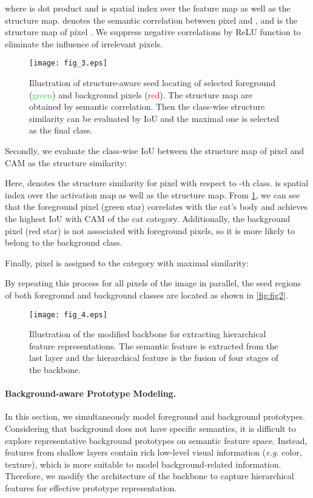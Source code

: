 \documentclass[10pt,twocolumn,letterpaper]{article}
\begin{document}
where  is dot product and  is spatial index over the feature map as well as the structure map.
 denotes the semantic correlation between pixel  and , and  is the structure map of pixel .
We suppress negative correlations by ReLU function to eliminate the influence of irrelevant pixels.

\begin{figure}[t]
    \centering
    \texttt{[image: fig\_3.eps]}
    \caption{Illustration of structure-aware seed locating of selected foreground (\textcolor{LimeGreen}{green}) and background pixels (\textcolor{red}{red}). The structure map are obtained by semantic correlation. Then the class-wise structure similarity can be evaluated by IoU and the maximal one is selected as the final class.}
    \label{fig:fig3}
\end{figure}

Secondly, we evaluate the class-wise IoU between the structure map of pixel  and CAM as the structure similarity:

Here,  denotes the structure similarity for pixel  with respect to -th class.
 is spatial index over the activation map as well as the structure map.
From \cref{fig:fig3}, we can see that the foreground pixel (green star) correlates with the cat's body and achieves the highest IoU with CAM of the cat category.
Additionally, the background pixel (red star) is not associated with foreground pixels, so it is more likely to belong to the background class.

Finally, pixel  is assigned to the category with maximal similarity:

By repeating this process for all pixels of the image in parallel, the seed regions  of both foreground and background classes are located as shown in \cref{fig:fig2}.

\begin{figure}[t]
    \centering
    \texttt{[image: fig\_4.eps]}
    \caption{Illustration of the modified backbone for extracting hierarchical feature representations. The semantic feature is extracted from the last layer and the hierarchical feature is the fusion of four stages of the backbone.}
    \label{fig:fig4}
\end{figure}

\paragraph{Background-aware Prototype Modeling.}
In this section, we simultaneously model foreground and background prototypes.
Considering that background does not have specific semantics, it is difficult to explore representative background prototypes on semantic feature space.
Instead, features from shallow layers contain rich low-level visual information (\textit{e.g.} color, texture), which is more suitable to model background-related information.
Therefore, we modify the architecture of the backbone to capture hierarchical features for effective prototype representation.
\end{document}
